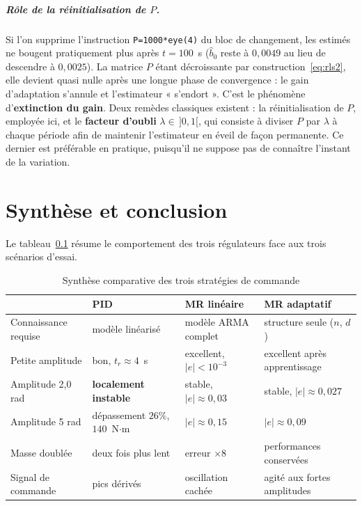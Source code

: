\documentclass[11pt,a4paper]{report}
\begin{document}
\paragraph{Rôle de la réinitialisation de $P$.} Si l'on supprime l'instruction
\texttt{P=1000*eye(4)} du bloc de changement, les estimés ne bougent pratiquement plus après
$t = 100$~s ($\hat b_0$ reste à $0{,}0049$ au lieu de descendre à $0{,}0025$). La matrice $P$
étant décroissante par construction~\eqref{eq:rls2}, elle devient quasi nulle après une longue
phase de convergence : le gain d'adaptation s'annule et l'estimateur « s'endort ». C'est le
phénomène d'\textbf{extinction du gain}. Deux remèdes classiques existent : la réinitialisation
de $P$, employée ici, et le \textbf{facteur d'oubli} $\lambda \in\,]0,1[$, qui consiste à
diviser $P$ par $\lambda$ à chaque période afin de maintenir l'estimateur en éveil de façon
permanente. Ce dernier est préférable en pratique, puisqu'il ne suppose pas de connaître
l'instant de la variation.

\chapter*{Synthèse et conclusion}

Le tableau~\ref{tab:synthese} résume le comportement des trois régulateurs face aux trois
scénarios d'essai.

\begin{table}[htbp]
\centering
\caption{Synthèse comparative des trois stratégies de commande}
\label{tab:synthese}
\begin{tabular}{p{3.2cm}p{3.4cm}p{3.4cm}p{3.4cm}}
\toprule
 & \textbf{PID} & \textbf{MR linéaire} & \textbf{MR adaptatif} \\
\midrule
Connaissance requise & modèle linéarisé & modèle ARMA complet & structure seule ($n$, $d$) \\
Petite amplitude & bon, $t_r \approx 4$~s & excellent, $|e|<10^{-3}$ & excellent après apprentissage \\
Amplitude 2,0 rad & \textbf{localement instable} & stable, $|e|\approx 0{,}03$ & stable, $|e|\approx 0{,}027$ \\
Amplitude 5 rad & dépassement $26\%$, $140$~N$\cdot$m & $|e|\approx 0{,}15$ & $|e|\approx 0{,}09$ \\
Masse doublée & deux fois plus lent & erreur $\times 8$ & performances conservées \\
Signal de commande & pics dérivés & oscillation cachée & agité aux fortes amplitudes \\
\bottomrule
\end{tabular}
\end{table}
\end{document}

